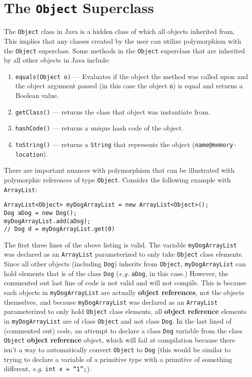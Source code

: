 \documentclass{tufte-handout}
\begin{document}
    \section*{The \texttt{Object} Superclass}
    The \texttt{Object} class in Java is a hidden class of which all objects inherited from. This implies that any classes created by the user can utilize polymorphism with the \texttt{Object} superclass. Some methods in the \texttt{Object} superclass that are inherited by all other objects in Java include:

    \begin{enumerate}
        \item \texttt{equals(Object o)} --- Evaluates if the object the method was called upon and the object argument passed (in this case the object \texttt{o}) is equal and returns a Boolean value.
        \item \texttt{getClass()} --- returns the class that object was instantiate from.
        \item \texttt{hashCode()} --- returns a unique hash code of the object.
        \item \texttt{toString()} --- returns a \texttt{String} that represents the object (\texttt{name@memory-location}).
    \end{enumerate}

    There are important nuances with polymorphism that can be illustrated with polymorphic references of type \texttt{Object}. Consider the following example with \texttt{ArrayList}:

    \begin{lstlisting}
ArrayList<Object> myDogArrayList = new ArrayList<Object>();
Dog aDog = new Dog();
myDogArrayList.add(aDog);
// Dog d = myDogArrayList.get(0)
    \end{lstlisting}

    The first three lines of the above listing is valid. The variable \texttt{myDogArrayList} was declared as an \texttt{ArrayList} parameterized to only take \texttt{Object} class elements. Since all other objects (including \texttt{Dog}) inherits from \texttt{Object}, \texttt{myDogArrayList} can hold elements that is of the class \texttt{Dog} (\textit{e.g.} \texttt{aDog}, in this case.) However, the commented out last line of code is not valid and will not compile. This is because each objects in \texttt{myDogArrayList} are actually \textbf{object references}, not the objects themselves, and because \texttt{myDogArrayList} was declared as an \texttt{ArrayList} parameterized to only hold \texttt{Object} class elements, all \textbf{object reference} elements in \texttt{myDogArrayList} are of class \texttt{Object} and not class \texttt{Dog}. In the last lined of (commented out) code, an attempt to declare a class \texttt{Dog} variable from the class \texttt{Object} \textbf{object reference} object, which will fail at compilation because there isn't a way to automatically convert \texttt{Object} to \texttt{Dog} (this would be similar to trying to declare a variable of a primitive type with a primitive of something different, \textit{e.g.} \texttt{int x = ``1'';}). 
\end{document}
